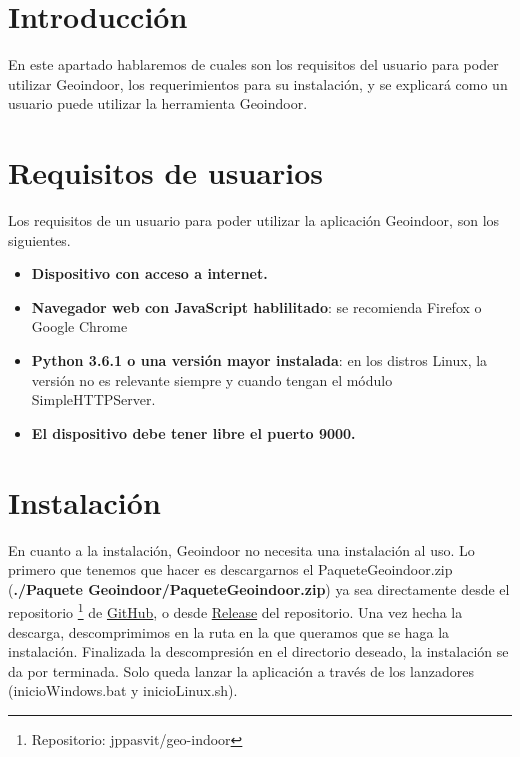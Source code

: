 
\section{Introducción}

En este apartado hablaremos de cuales son los requisitos del usuario para poder utilizar Geoindoor, los requerimientos para su instalación, y se explicará como un usuario puede utilizar la herramienta Geoindoor. 

\section{Requisitos de usuarios}

Los requisitos de un usuario para poder utilizar la aplicación Geoindoor, son los siguientes.

\begin{itemize}
	\item \textbf{Dispositivo con acceso a internet.}
	\item \textbf{Navegador web con JavaScript hablilitado}: se recomienda Firefox o Google Chrome
	\item \textbf{Python 3.6.1 o una versión mayor instalada}: en los distros Linux, la versión no es relevante siempre y cuando tengan el módulo SimpleHTTPServer.
	\item \textbf{El dispositivo debe tener libre el puerto 9000.}
\end{itemize}

\section{Instalación}


En cuanto a la instalación, Geoindoor no necesita una instalación al uso. Lo primero que tenemos que hacer es descargarnos el PaqueteGeoindoor.zip (\textbf{./Paquete Geoindoor/PaqueteGeoindoor.zip}) ya sea directamente desde el repositorio \footnote{Repositorio: jppasvit/geo-indoor} de \href{https://github.com/jppasvit/geo-indoor/tree/master/Paquete\%20Geoindoor}{GitHub}, o desde \href{https://github.com/jppasvit/geo-indoor/releases}{Release} del repositorio. Una vez hecha la descarga, descomprimimos en la ruta en la que queramos que se haga la instalación. Finalizada la descompresión en el directorio deseado, la instalación se da por terminada. Solo queda lanzar la aplicación a través de los lanzadores (inicioWindows.bat y inicioLinux.sh).

